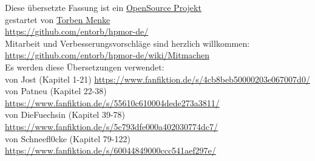 \newpage
\vspace*{2cm}
\begin{center}
\noindent
Diese übersetzte Fassung ist ein \href{https://github.com/entorb/hpmor-de/}{OpenSource Projekt}\\
gestartet von \href{https://entorb.net}{Torben Menke}\\
{\small \url{https://github.com/entorb/hpmor-de/}}\\
\vspace*{3cm}
Mitarbeit und Verbesserungsvorschläge sind herzlich willkommen:\\
{\small\url{https://github.com/entorb/hpmor-de/wiki/Mitmachen}}\\
\vspace*{3cm}
Es werden diese Übersetzungen verwendet:\\
von Jost (Kapitel 1-21) {\small \url{https://www.fanfiktion.de/s/4cb8beb50000203e067007d0/}}\\
von Patneu (Kapitel 22-38) {\small \url{https://www.fanfiktion.de/s/55610c610004dede273a3811/}}\\
von DieFuechsin (Kapitel 39-78) {\small \url{https://www.fanfiktion.de/s/5c793dfe000a402030774dc7/}}\\
von Schneefl0cke (Kapitel 79-122) {\small \url{https://www.fanfiktion.de/s/60044849000ccc541aef297e/}}\\
\end{center}
